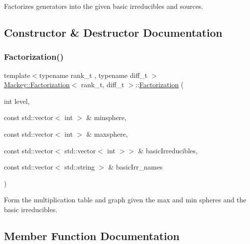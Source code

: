 Factorizes generators into the given basic irreducibles and sources. 

\subsection{Constructor \& Destructor Documentation}
\mbox{\label{classMackey_1_1Factorization_af1b07ab5021c4e51698c4cd3fbb85422}} 
\subsubsection{\texorpdfstring{Factorization()}{Factorization()}}
{\footnotesize\ttfamily template$<$typename rank\+\_\+t , typename diff\+\_\+t $>$ \\
\hyperlink{classMackey_1_1Factorization}{Mackey\+::\+Factorization}$<$ rank\+\_\+t, diff\+\_\+t $>$\+::\hyperlink{classMackey_1_1Factorization}{Factorization} (\begin{DoxyParamCaption}\item[{int}]{level,  }\item[{const std\+::vector$<$ int $>$ \&}]{minsphere,  }\item[{const std\+::vector$<$ int $>$ \&}]{maxsphere,  }\item[{const std\+::vector$<$ std\+::vector$<$ int $>$$>$ \&}]{basic\+Irreducibles,  }\item[{const std\+::vector$<$ std\+::string $>$ \&}]{basic\+Irr\+\_\+names }\end{DoxyParamCaption})}



Form the multiplication table and graph given the max and min spheres and the basic irreducibles. 



\subsection{Member Function Documentation}
\mbox{\label{classMackey_1_1Factorization_a2e135a37687fc3d69cd16a8729dd19eb}} 
